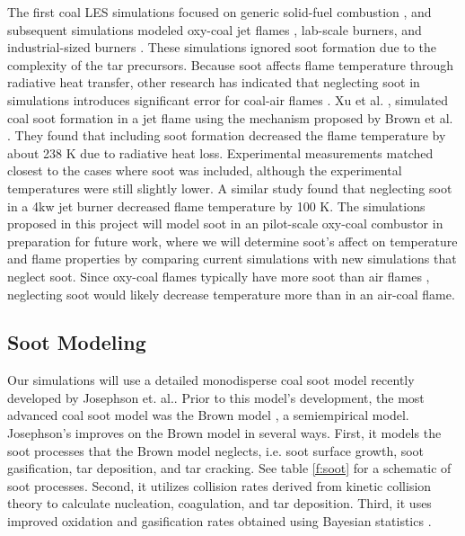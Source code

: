 \documentclass[12pt]{wssci}
\begin{document}
	
	The first coal LES simulations focused on generic solid-fuel combustion \citep{Kurose2003}, and subsequent simulations modeled oxy-coal jet flames \citep{Yamamoto20111771}, lab-scale burners\citep{Stein2012}, and industrial-sized burners \citep{Kurose2009} \citep{Gharebaghi2011}.  These simulations ignored soot formation due to the complexity of the tar precursors.  Because soot affects flame temperature through radiative heat transfer, other research has indicated that neglecting soot in simulations introduces significant error for coal-air flames \cite{Xu2017}\cite{Takahashi2019}.  Xu et al. \cite{Xu2017}, simulated coal soot formation in a jet flame using the mechanism proposed by Brown et al. \cite{Brown1998}.  They found that including soot formation decreased the flame temperature by about 238 K due to radiative heat loss.  Experimental measurements matched closest to the cases where soot was included, although the experimental temperatures were still slightly lower.  A similar study \cite{Takahashi2019} found that neglecting soot in a 4kw jet burner decreased flame temperature by 100 K.  The simulations proposed in this project will model soot in an pilot-scale oxy-coal combustor in preparation for future work, where we will determine soot's affect on temperature and flame properties by comparing current simulations with new simulations that neglect soot.  Since oxy-coal flames typically have more soot than air flames \cite{Stimpson2013}, neglecting soot would likely decrease temperature more than in an air-coal flame. 


\subsection{Soot Modeling}

	Our simulations will use a detailed monodisperse coal soot model recently developed by Josephson et. al.\cite{Josephson2019}.  Prior to this model's development, the most advanced coal soot model was the Brown model \cite{Brown1998}, a semiempirical model.  Josephson's improves on the Brown model in several ways. First, it models the soot processes that the Brown model neglects, i.e. soot surface growth, soot gasification, tar deposition, and tar cracking.  See table \ref{f:soot} for a schematic of soot processes.  Second, it utilizes collision rates derived from kinetic collision theory to calculate nucleation, coagulation, and tar deposition.  Third, it uses improved oxidation and gasification rates obtained using Bayesian statistics \cite{Josephson2017}.  
	
\end{document}
